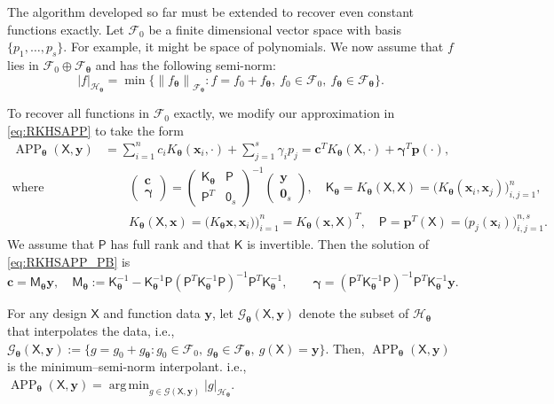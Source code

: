 \documentclass[]{mcom-l}
\theoremstyle{remark}
\DeclareMathOperator*{\argmin}{arg\,min}
\DeclareMathOperator{\APP}{APP}
\newcommand{\mK}{\mathsf{K}}
\newcommand{\mM}{\mathsf{M}}
\newcommand{\mP}{\mathsf{P}}
\newcommand{\mX}{\mathsf{X}}
\newcommand{\mZero}{\mathsf{0}}
\newcommand{\bzero}{\boldsymbol{0}}
\newcommand{\bc}{{\boldsymbol{c}}}
\newcommand{\bx}{{\boldsymbol{x}}}
\newcommand{\bp}{{\boldsymbol{p}}}
\newcommand{\by}{{\boldsymbol{y}}}
\newcommand{\bgamma}{{\boldsymbol{\gamma}}}
\newcommand{\btheta}{{\boldsymbol{\theta}}}
\newcommand{\calf}{{\mathcal{F}}}
\newcommand{\calh}{{\mathcal{H}}}
\newcommand{\calg}{{\mathcal{G}}}
\def\abs#1{\ensuremath{\left \lvert #1 \right \rvert}}
\newcommand{\norm}[2][{}]{\ensuremath{\left \lVert #2 \right \rVert}_{#1}}
\begin{document}
The algorithm developed so far must be extended to recover even constant functions exactly.  Let $\calf_0$ be a finite dimensional vector space with basis $\{p_1, \ldots, p_s\}$.  For example, it might be space of polynomials.  We now assume that $f$ lies in $\calf_0 \oplus \calf_\btheta$ and has the following semi-norm:
\begin{equation} \label{eq:seminorm} 
\abs{f}_{\calh_\btheta} = \min \{ \norm[\calf_\btheta] {f_\btheta} : f = f_0 + f_\btheta, \ f_0 \in \calf_0, \ f_\btheta \in \calf_\btheta \}.
\end{equation}

To recover all functions in $\calf_0$ exactly, we modify our approximation in \eqref{eq:RKHSAPP} to take the form 
\begin{subequations} \label{eq:RKHSAPP_P}
	\begin{align} 
	\APP_\btheta(\mX,\by) &= \sum_{i=1}^n c_i K_\btheta(\bx_i,\cdot) + \sum_{j=1}^s \gamma_i p_j = \bc^T K_\btheta(\mX,\cdot) + \bgamma^T \bp(\cdot), \\
	\label{eq:RKHSAPP_PB}
	\text{where } & \qquad \begin{pmatrix} \bc \\ \bgamma \end{pmatrix} = 
	\begin{pmatrix} \mK_\btheta  & \mP \\ \mP^T & \mZero_s \end{pmatrix}^{-1} 
	\begin{pmatrix}\by \\ \bzero_s \end{pmatrix}, 
	\quad \mK_\btheta = K_\btheta(\mX,\mX) = \bigl( K_\btheta(\bx_i,\bx_j) \bigr)_{i,j=1}^n,  \\
	& \qquad  K_\btheta(\mX,\bx) = \bigl(K_\btheta\bx,\bx_i) \bigr)_{i=1}^n =  K_\btheta(\bx, \mX)^T, \quad \mP = \bp^T(\mX) = \bigl( p_j(\bx_i)\bigr )_{i,j=1}^{n,s}.
	\end{align}
\end{subequations}
We assume that $\mP$ has full rank and that $\mK$ is invertible. Then the solution of \eqref{eq:RKHSAPP_PB} is
\begin{equation}
\bc = \mM_\btheta \by, \quad \mM_\btheta := \mK_\btheta^{-1} - \mK_\btheta^{-1}\mP (\mP^T \mK_\btheta^{-1} \mP)^{-1} \mP^T \mK_\btheta^{-1}, \qquad
\bgamma = (\mP^T \mK_\btheta^{-1} \mP)^{-1} \mP^T \mK_\btheta^{-1} \by.
\end{equation}


For any design $\mX$ and function data $\by$, let $\calg_\btheta(\mX,\by)$ denote the subset of $\calh_\btheta$ that interpolates the data, i.e., $\calg_\btheta(\mX,\by) := \{ g = g_0 + g_{\btheta} : g_0 \in \calf_0, \ g_{\btheta} \in \calf_{\btheta}, \ g(\mX)  = \by\}$.  
Then, $\APP_\btheta(\mX,\by)$ is the minimum--semi-norm interpolant. i.e., $\APP_\btheta(\mX,\by) = \argmin_{g \in \calg(\mX,\by)}  \abs{g}_{\calh_\btheta}$.
\end{document}
